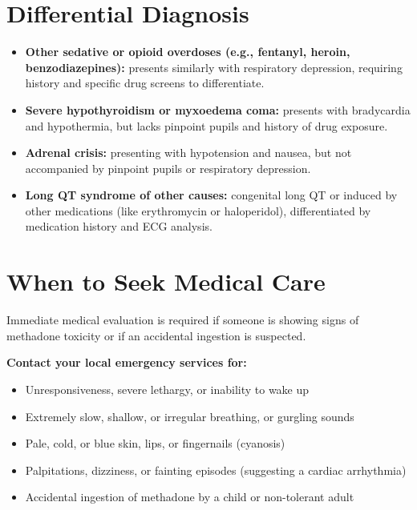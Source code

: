 \section*{Differential Diagnosis}
\begin{itemize}
    \item \textbf{Other sedative or opioid overdoses (e.g., fentanyl, heroin, benzodiazepines):} presents similarly with respiratory depression, requiring history and specific drug screens to differentiate.
    \item \textbf{Severe hypothyroidism or myxoedema coma:} presents with bradycardia and hypothermia, but lacks pinpoint pupils and history of drug exposure.
    \item \textbf{Adrenal crisis:} presenting with hypotension and nausea, but not accompanied by pinpoint pupils or respiratory depression.
    \item \textbf{Long QT syndrome of other causes:} congenital long QT or induced by other medications (like erythromycin or haloperidol), differentiated by medication history and ECG analysis.
\end{itemize}

\section*{When to Seek Medical Care}
Immediate medical evaluation is required if someone is showing signs of methadone toxicity or if an accidental ingestion is suspected.

\textbf{Contact your local emergency services for:}
\begin{itemize}
    \item Unresponsiveness, severe lethargy, or inability to wake up
    \item Extremely slow, shallow, or irregular breathing, or gurgling sounds
    \item Pale, cold, or blue skin, lips, or fingernails (cyanosis)
    \item Palpitations, dizziness, or fainting episodes (suggesting a cardiac arrhythmia)
    \item Accidental ingestion of methadone by a child or non-tolerant adult
\end{itemize}

